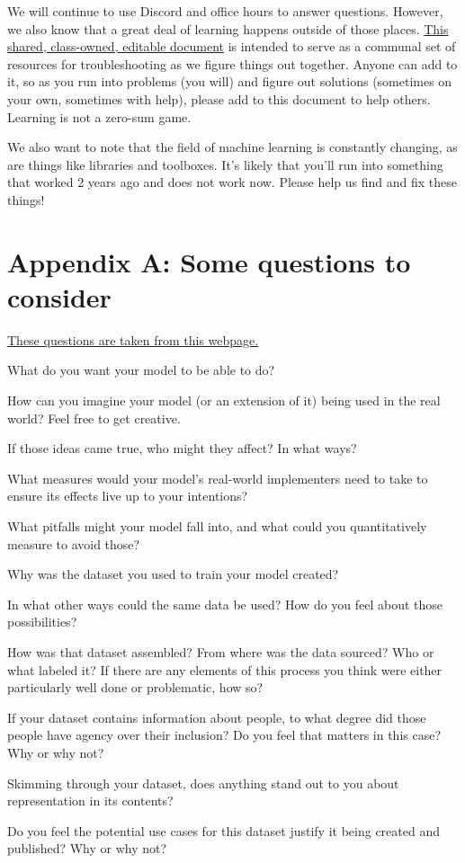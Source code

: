 \documentclass{tufte-handout}
\begin{document}
We will continue to use Discord and office hours to answer questions. However, we also know that a great deal of learning happens outside of those places.  \href{https://docs.google.com/document/d/14C1dtiLiPF2cAy3alt4PLl0UhkuxPrDZsHgeq-pjwAU/edit?usp=sharing}{This shared, class-owned, editable document} is intended to serve as a communal set of resources for troubleshooting as we figure things out together. Anyone can add to it, so as you run into problems (you will) and figure out solutions (sometimes on your own, sometimes with help), please add to this document to help others. Learning is not a zero-sum game.

We also want to note that the field of machine learning is constantly changing, as are things like libraries and toolboxes. It's likely that you'll run into something that worked 2 years ago and does not work now. Please help us find and fix these things!



\section{Appendix A: Some questions to consider}
\href{https://www.notion.so/ANN-Project-Framing-76e1b6af347f475a983487996ac9760d}{These questions are taken from this webpage.}
\bi
\item What do you want your model to be able to do?
\item How can you imagine your model (or an extension of it) being used in the real world? Feel free to get creative.
\item If those ideas came true, who might they affect? In what ways?
\item What measures would your model's real-world implementers need to take to ensure its effects live up to your intentions?
\item What pitfalls might your model fall into, and what could you quantitatively measure to avoid those?
\item Why was the dataset you used to train your model created?
\item In what other ways could the same data be used? How do you feel about those possibilities?
\item How was that dataset assembled? From where was the data sourced? Who or what labeled it? If there are any elements of this process you think were either particularly well done or problematic, how so?
\item If your dataset contains information about people, to what degree did those people have agency over their inclusion? Do you feel that matters in this case? Why or why not?
\item Skimming through your dataset, does anything stand out to you about representation in its contents?
\item Do you feel the potential use cases for this dataset justify it being created and published? Why or why not?
\ei
\end{document}
